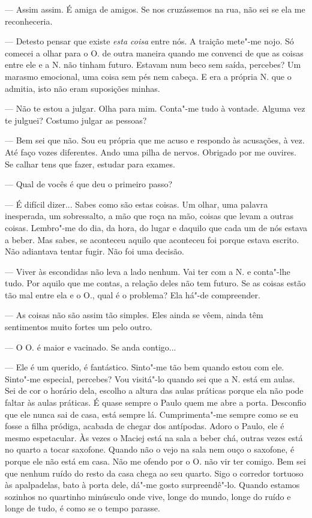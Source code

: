 --- Assim assim. É amiga de amigos. Se nos cruzássemos na rua, não sei se
  ela me reconheceria.

--- Detesto pensar que existe \emph{esta coisa }entre nós. A traição
  mete"-me nojo. Só comecei a olhar para o O. de outra maneira quando me
  convenci de que as coisas entre ele e a N. não tinham futuro. Estavam
  num beco sem saída, percebes? Um marasmo emocional, uma coisa sem pés
  nem cabeça. E era a própria N. que o admitia, isto não eram suposições
  minhas.

--- Não te estou a julgar. Olha para mim. Conta"-me tudo à vontade. Alguma
  vez te julguei? Costumo julgar as pessoas?

--- Bem sei que não. Sou eu própria que me acuso e respondo às
  acusações, à vez. Até faço vozes diferentes. Ando uma pilha de nervos.
  Obrigado por me ouvires. Se calhar tens
que fazer, estudar para exames.

--- Qual de vocês é que deu o primeiro passo?

--- É difícil dizer... Sabes como são estas coisas. Um olhar, uma palavra
  inesperada, um sobressalto, a mão que roça na mão, coisas que levam a
  outras coisas. Lembro"-me do dia, da hora, do lugar e daquilo que cada
  um de nós estava a beber. Mas sabes, se aconteceu aquilo que aconteceu
  foi porque estava escrito. Não adiantava tentar fugir. Não foi uma
  decisão.

--- Viver às escondidas não leva a lado nenhum. Vai ter com a N. e
  conta"-lhe tudo. Por aquilo que me contas, a relação deles não tem
  futuro. Se as coisas estão tão mal entre ela e o O., qual é o
  problema? Ela há"-de compreender.

--- As coisas não são assim tão simples. Eles ainda se vêem, ainda têm
  sentimentos muito fortes um pelo outro.

--- O O. é maior e vacinado. Se anda contigo...

--- Ele é um querido, é fantástico. Sinto"-me tão bem quando estou com ele.
  Sinto"-me especial, percebes? Vou visitá"-lo quando sei que a N. está
  em aulas. Sei de cor o horário dela, escolho a altura das aulas
  práticas porque ela não pode faltar às aulas práticas. É quase sempre
  o Paulo quem me abre a porta. Desconfio que ele nunca sai de casa,
  está sempre lá. Cumprimenta"-me sempre como se eu fosse a filha
  pródiga, acabada de chegar dos antípodas. Adoro o Paulo, ele é mesmo
  espetacular. Às vezes o Maciej está na sala a beber chá, outras vezes
  está no quarto a tocar saxofone. Quando não o vejo na sala nem ouço o
  saxofone, é porque ele não está em casa. Não me ofendo por o O. não
  vir ter comigo. Bem sei que nenhum ruído do resto da casa chega ao seu
  quarto. Sigo o corredor tortuoso às apalpadelas, bato à porta dele,
  dá"-me gosto surpreendê"-lo. Quando estamos sozinhos no quartinho
  minúsculo onde vive, longe do mundo, longe
do ruído e longe de tudo, é como se o tempo parasse.

